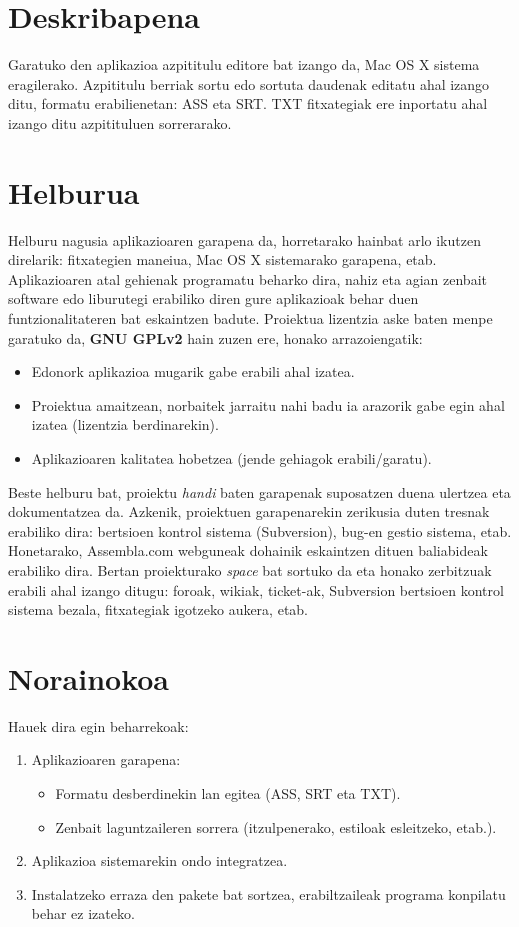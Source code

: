 
\section{Deskribapena}
Garatuko den aplikazioa azpititulu editore bat izango da, Mac OS X sistema eragilerako. Azpititulu berriak sortu edo sortuta daudenak editatu ahal izango ditu, formatu erabilienetan: ASS eta SRT. TXT fitxategiak ere inportatu ahal izango ditu azpitituluen sorrerarako.

\section{Helburua}
Helburu nagusia aplikazioaren garapena da, horretarako hainbat arlo ikutzen direlarik: fitxategien maneiua, Mac OS X sistemarako garapena, etab.
Aplikazioaren atal gehienak programatu beharko dira, nahiz eta agian zenbait software edo liburutegi erabiliko diren gure aplikazioak behar duen funtzionalitateren bat eskaintzen badute.
Proiektua lizentzia aske baten menpe garatuko da, \textbf{GNU GPLv2} hain zuzen ere, honako arrazoiengatik:
\begin{itemize}
\item Edonork aplikazioa mugarik gabe erabili ahal izatea.
\item Proiektua amaitzean, norbaitek jarraitu nahi badu ia arazorik gabe egin ahal izatea (lizentzia berdinarekin).
\item Aplikazioaren kalitatea hobetzea (jende gehiagok erabili/garatu).
\end{itemize}
Beste helburu bat, proiektu \textit{handi} baten garapenak suposatzen duena ulertzea eta dokumentatzea da.
Azkenik, proiektuen garapenarekin zerikusia duten tresnak erabiliko dira: bertsioen kontrol sistema (Subversion), bug-en gestio sistema, etab. Honetarako, Assembla.com webguneak dohainik eskaintzen dituen baliabideak erabiliko dira. Bertan proiekturako \textit{space} bat sortuko da eta honako zerbitzuak erabili ahal izango ditugu: foroak, wikiak, ticket-ak, Subversion bertsioen kontrol sistema bezala, fitxategiak igotzeko aukera, etab.

\section{Norainokoa}
Hauek dira egin beharrekoak:
\begin{enumerate}
\item Aplikazioaren garapena:
	\begin{itemize}
	\item Formatu desberdinekin lan egitea (ASS, SRT eta TXT).
	\item Zenbait laguntzaileren sorrera (itzulpenerako, estiloak esleitzeko, etab.).
	\end{itemize}
\item Aplikazioa sistemarekin ondo integratzea.
\item Instalatzeko erraza den pakete bat sortzea, erabiltzaileak programa konpilatu behar ez izateko.
\end{enumerate}

